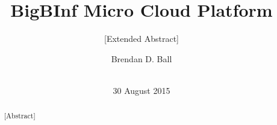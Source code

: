 \documentclass{sig-alternate-05-2015}
\begin{document}


\title{BigBInf Micro Cloud Platform}
\subtitle{[Extended Abstract]}

\author{
\alignauthor
Brendan D. Ball\\
       \\
}

\date{30 August 2015}


\maketitle
\begin{abstract}
[Abstract]
\end{abstract}
\end{document}
